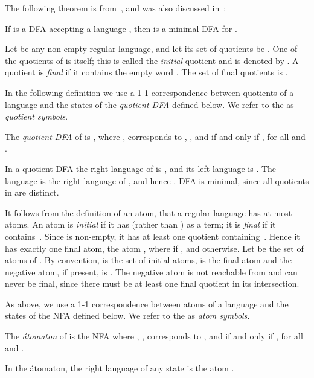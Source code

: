 \documentclass{llncs}
\begin{document}
The following theorem is from~\cite{Brz63}, and was also discussed in~\cite{BrTa11}: 

\begin{theorem}[Determinization]
\label{thm:Brz}
If  is a DFA accepting a language , then  is 
a minimal DFA for .
\end{theorem}

Let  be any non-empty regular language, and let
its set of quotients be . 
One of the quotients of  is  itself;
this is called the \emph{initial} quotient and is denoted by .
A quotient is  \emph{final} if it contains the empty word .
The set of final quotients is  .

In the following definition we use a 1-1 correspondence 
 between quotients  of 
a language  and the states  of the \emph{quotient DFA} 
 defined below.
We refer to the  as \emph{quotient symbols}.
\begin{definition}
\label{def:quotientDFA}
\vskip-0.1cm
The \emph{quotient DFA} of  is 
, where
,
 corresponds to ,
, and 
 if and only if 
, for all  and .
\end{definition}

In a quotient DFA
the right language of  is , and 
its left language 
is .
The  language   is the right language of , and hence 
.
DFA  is minimal, since all quotients in  are distinct.


It follows from the definition of an atom, that a regular language   has at most  atoms. 
An atom is \emph{initial} if it has  (rather than ) as a term;
it is \emph{final} if it contains~.
Since  is non-empty, it has at least one quotient containing~. 
Hence it has exactly one final atom, the atom 
, where 
 if , and  otherwise.
Let   be the set of atoms of .
By convention,  is the set of initial atoms,   is the final atom and the negative atom, if present, is .
The negative atom  is not reachable from  and can never be final, since there must be at least one final quotient in its intersection.

As above, we use a 1-1 correspondence 
 between atoms  of a language  and 
the states  of the NFA  defined below.
We refer to the  as \emph{atom symbols.}

\begin{definition}
\label{def:atomaton}
The \emph{\'atomaton} of 
 is the NFA 
 where ,
 , 
  corresponds to ,
 and  if and only if 
, for all  and .
\end{definition}

In the \'atomaton, the right language of any state  is the atom .
\smallskip
\end{document}
